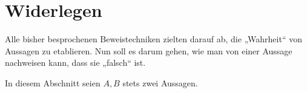 \section{Widerlegen}


Alle bisher besprochenen Beweistechniken zielten darauf ab, die „Wahrheit“ von Aussagen zu etablieren. Nun soll es darum gehen, wie man von einer Aussage nachweisen kann, dass sie „falsch“ ist.

In diesem Abschnitt seien $A,B$ stets zwei Aussagen.


